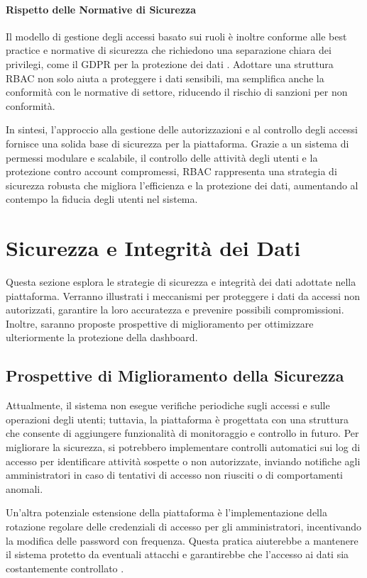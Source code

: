 \paragraph{Rispetto delle Normative di Sicurezza}
Il modello di gestione degli accessi basato sui ruoli è inoltre conforme alle best practice e normative di sicurezza che richiedono una separazione chiara dei privilegi, come il GDPR per la protezione dei dati \cite{gdpr2016regulation}. Adottare una struttura RBAC non solo aiuta a proteggere i dati sensibili, ma semplifica anche la conformità con le normative di settore, riducendo il rischio di sanzioni per non conformità.

In sintesi, l’approccio alla gestione delle autorizzazioni e al controllo degli accessi fornisce una solida base di sicurezza per la piattaforma. Grazie a un sistema di permessi modulare e scalabile, il controllo delle attività degli utenti e la protezione contro account compromessi, RBAC rappresenta una strategia di sicurezza robusta che migliora l’efficienza e la protezione dei dati, aumentando al contempo la fiducia degli utenti nel sistema.


\section{Sicurezza e Integrità dei Dati} 
Questa sezione esplora le strategie di sicurezza e integrità dei dati adottate nella piattaforma. Verranno illustrati i meccanismi per proteggere i dati da accessi non autorizzati, garantire la loro accuratezza e prevenire possibili compromissioni. Inoltre, saranno proposte prospettive di miglioramento per ottimizzare ulteriormente la protezione della dashboard.

\subsection{Prospettive di Miglioramento della Sicurezza}

Attualmente, il sistema non esegue verifiche periodiche sugli accessi e sulle operazioni degli utenti; tuttavia, la piattaforma è progettata con una struttura che consente di aggiungere funzionalità di monitoraggio e controllo in futuro. Per migliorare la sicurezza, si potrebbero implementare controlli automatici sui log di accesso per identificare attività sospette o non autorizzate, inviando notifiche agli amministratori in caso di tentativi di accesso non riusciti o di comportamenti anomali.

Un'altra potenziale estensione della piattaforma è l'implementazione della rotazione regolare delle credenziali di accesso per gli amministratori, incentivando la modifica delle password con frequenza. Questa pratica aiuterebbe a mantenere il sistema protetto da eventuali attacchi e garantirebbe che l’accesso ai dati sia costantemente controllato \cite{bishop2003computer}.

